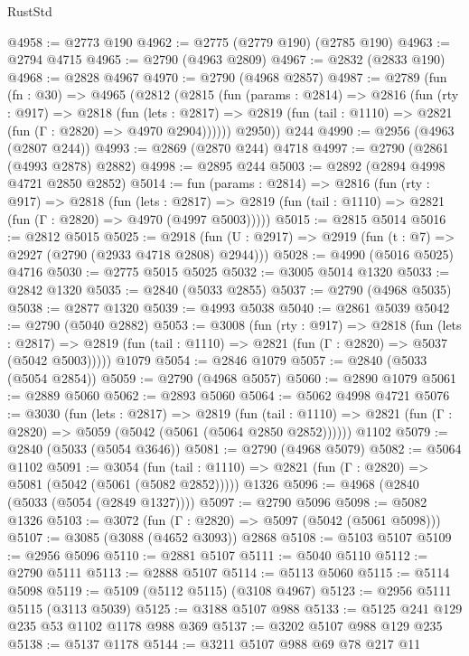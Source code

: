 \begin{lexlean}{RustStd}
\begin{coremodule}
{\begin{coremodule}
{{{{{{{{{{{{{{{{{{{{{{{{{{@4958 := @2773 @190
@4962 := @2775 (@2779 @190) (@2785 @190)
@4963 := @2794 @4715
@4965 := @2790 (@4963 @2809)
@4967 := @2832 (@2833 @190)
@4968 := @2828 @4967
@4970 := @2790 (@4968 @2857)
@4987 := @2789
    (fun (fn : @30) =>
    @4965
      (@2812
        (@2815
          (fun (params : @2814) =>
          @2816
            (fun (rty : @917) =>
            @2818
              (fun (lets : @2817) =>
              @2819 (fun (tail : @1110) => @2821 (fun (Γ : @2820) => @4970 @2904))))))
        @2950))
    @244
@4990 := @2956 (@4963 (@2807 @244))
@4993 := @2869 (@2870 @244) @4718
@4997 := @2790 (@2861 (@4993 @2878) @2882)
@4998 := @2895 @244
@5003 := @2892 (@2894 @4998 @4721 @2850 @2852)
@5014 := fun (params : @2814) =>
  @2816
    (fun (rty : @917) =>
    @2818
      (fun (lets : @2817) =>
      @2819 (fun (tail : @1110) => @2821 (fun (Γ : @2820) => @4970 (@4997 @5003)))))
@5015 := @2815 @5014
@5016 := @2812 @5015
@5025 := @2918 (fun (U : @2917) => @2919 (fun (t : @7) => @2927 (@2790 (@2933 @4718 @2808) @2944)))
@5028 := @4990 (@5016 @5025) @4716
@5030 := @2775 @5015 @5025
@5032 := @3005 @5014 @1320
@5033 := @2842 @1320
@5035 := @2840 (@5033 @2855)
@5037 := @2790 (@4968 @5035)
@5038 := @2877 @1320
@5039 := @4993 @5038
@5040 := @2861 @5039
@5042 := @2790 (@5040 @2882)
@5053 := @3008
    (fun (rty : @917) =>
    @2818
      (fun (lets : @2817) =>
      @2819 (fun (tail : @1110) => @2821 (fun (Γ : @2820) => @5037 (@5042 @5003)))))
    @1079
@5054 := @2846 @1079
@5057 := @2840 (@5033 (@5054 @2854))
@5059 := @2790 (@4968 @5057)
@5060 := @2890 @1079
@5061 := @2889 @5060
@5062 := @2893 @5060
@5064 := @5062 @4998 @4721
@5076 := @3030
    (fun (lets : @2817) =>
    @2819
      (fun (tail : @1110) => @2821 (fun (Γ : @2820) => @5059 (@5042 (@5061 (@5064 @2850 @2852))))))
    @1102
@5079 := @2840 (@5033 (@5054 @3646))
@5081 := @2790 (@4968 @5079)
@5082 := @5064 @1102
@5091 := @3054
    (fun (tail : @1110) => @2821 (fun (Γ : @2820) => @5081 (@5042 (@5061 (@5082 @2852)))))
    @1326
@5096 := @4968 (@2840 (@5033 (@5054 (@2849 @1327))))
@5097 := @2790 @5096
@5098 := @5082 @1326
@5103 := @3072 (fun (Γ : @2820) => @5097 (@5042 (@5061 @5098)))
@5107 := @3085 (@3088 (@4652 @3093)) @2868
@5108 := @5103 @5107
@5109 := @2956 @5096
@5110 := @2881 @5107
@5111 := @5040 @5110
@5112 := @2790 @5111
@5113 := @2888 @5107
@5114 := @5113 @5060
@5115 := @5114 @5098
@5119 := @5109 (@5112 @5115) (@3108 @4967)
@5123 := @2956 @5111 @5115 (@3113 @5039)
@5125 := @3188 @5107 @988
@5133 := @5125 @241 @129 @235 @53 @1102 @1178 @988 @369
@5137 := @3202 @5107 @988 @129 @235
@5138 := @5137 @1178
@5144 := @3211 @5107 @988 @69 @78 @217 @11
}}}}}}}}}}}}}}}}}}}}}}}}}}
\end{coremodule}}
\end{coremodule}
\end{lexlean}
